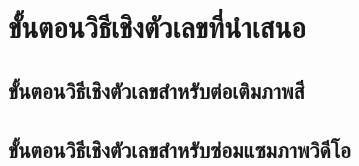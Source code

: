 \section{ขั้นตอนวิธีเชิงตัวเลขที่นำเสนอ}
\subsection{ขั้นตอนวิธีเชิงตัวเลขสำหรับต่อเติมภาพสี}
\subsection{ขั้นตอนวิธีเชิงตัวเลขสำหรับซ่อมแซมภาพวิดีโอ}